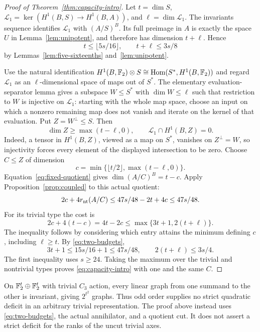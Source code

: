 \begin{proof}[Proof of Theorem~\ref{thm:capacity-intro}]
Let $t=\dim S$, $\mathcal L_1=\ker(H^1(B,S)\to H^1(B,A))$,
and $\ell=\dim\mathcal L_1$. The invariants sequence identifies
$\mathcal L_1$ with $(A/S)^B$. Its full preimage in $A$ is exactly the
space $U$ in Lemma~\ref{lem:unipotent}, and therefore has dimension
$t+\ell$. Hence
\begin{equation}\label{eq:two-budgets}
 t\leq\lfloor5s/16\rfloor,\qquad t+\ell\leq3s/8
\end{equation}
by Lemmas~\ref{lem:five-sixteenths} and~\ref{lem:unipotent}.

Use the natural identification
$H^1(B,\mathbb F_2)\otimes S\cong
\operatorname{Hom}(S^*,H^1(B,\mathbb F_2))$ and regard $\mathcal L_1$ as an
$\ell$-dimensional space of maps out of $S^*$.  The elementary
evaluation-separator lemma gives a subspace $W\leq S^*$ with
$\dim W\leq\ell$ such that restriction to $W$ is injective on
$\mathcal L_1$: starting with the whole map space, choose an input on
which a nonzero remaining map does not vanish and iterate on the kernel
of that evaluation.  Put $Z=W^\perp\leq S$. Then
\[
 \dim Z\geq\max(t-\ell,0),\qquad
 \mathcal L_1\cap H^1(B,Z)=0.
\]
Indeed, a tensor in $H^1(B,Z)$, viewed as a map on $S^*$, vanishes on
$Z^\perp=W$, so injectivity forces every element of the displayed
intersection to be zero. Choose $C\leq Z$ of dimension
\[
 c=\min\{\lfloor t/2\rfloor,\max(t-\ell,0)\}.
\]
Equation~\eqref{eq:fixed-quotient} gives $\dim(A/C)^B=t-c$.
Apply Proposition~\ref{prop:coupled} to this actual quotient:
\[
 2c+4r_{\rm nt}(A/C)\leq47s/48-2t+4c\leq47s/48.
\]
For its trivial type the cost is
\[
 2c+4(t-c)=4t-2c\leq\max\{3t+1,2(t+\ell)\}.
\]
The inequality follows by considering which entry attains the minimum
defining $c$, including $\ell\geq t$. By \eqref{eq:two-budgets},
\[
 3t+1\leq15s/16+1\leq47s/48,\qquad
 2(t+\ell)\leq3s/4.
\]
The first inequality uses $s\geq24$. Taking the maximum over the
trivial and nontrivial types proves \eqref{eq:capacity-intro} with one
and the same $C$.
\end{proof}

\begin{remark}
On $\mathbb F_2^t\oplus\mathbb F_2^t$ with trivial $C_3$ action, every linear graph
from one summand to the other is invariant, giving $2^{t^2}$ graphs.
Thus odd order supplies no strict quadratic deficit in an arbitrary
trivial representation. The proof above instead uses
\eqref{eq:two-budgets}, the actual annihilator, and a quotient cut.
It does not assert a strict deficit for the ranks of the uncut trivial
axes.
\end{remark}
